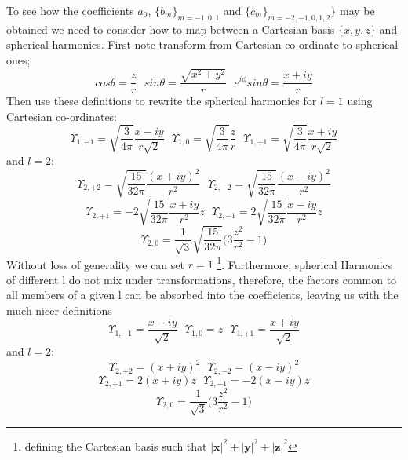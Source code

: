 \documentclass[12pt]{article}
\begin{document}
\noindent To see how the coefficients $a_{0}$, $\{b_{m}\}_{m=-1,0,1}$ and 
 $\{c_{m}\}_{m=-2,-1,0,1,2}\}$ may be
obtained we need to consider how to map between a Cartesian basis $\{x,y,z\}$
and spherical harmonics. First note transform from Cartesian co-ordinate to 
spherical ones; 
\begin{equation}
cos \theta = \frac{z}{r} \text{\ \ \ }
sin \theta = \frac{\sqrt{x^{2}+y^{2}}}{r} \text{\ \ \ }
e^{i\phi} sin\theta  = \frac{x+iy}{r} 
\end{equation}
\noindent Then use these definitions to rewrite the spherical harmonics for
$l=1$ using Cartesian co-ordinates:
\begin{equation}
\Upsilon_{1,-1} = \sqrt{\frac{3}{4\pi}}\frac{x-iy}{r\sqrt{2}} \text{\ \ \ }
\Upsilon_{1,0} = \sqrt{\frac{3}{4\pi}}\frac{z}{r} \text{\ \ \ }
\Upsilon_{1,+1} = \sqrt{\frac{3}{4\pi}}\frac{x+iy}{r\sqrt{2}}
\end{equation}
and $l=2$:
\begin{equation*}
\Upsilon_{2,+2} = \sqrt{\frac{15}{32\pi}}\frac{(x+iy)^{2}}{r^{2}} \text{\ \ \ }
\Upsilon_{2,-2} = \sqrt{\frac{15}{32\pi}}\frac{(x-iy)^{2}}{r^{2}}
\end{equation*}
\begin{equation*}
\Upsilon_{2,+1} = -2\sqrt{\frac{15}{32\pi}}\frac{x+iy}{r^{2}}z \text{\ \ \ }
\Upsilon_{2,-1} = 2\sqrt{\frac{15}{32\pi}}\frac{x-iy}{r^{2}}z
 \end{equation*}
\begin{equation}
\Upsilon_{2,0} = \frac{1}{\sqrt{3}}
 \sqrt{\frac{15}{32\pi}}\Bigg( 3 \frac{z^{2}}{r^{2}} -1 \Bigg )
\end{equation}
\noindent Without loss of generality we can set $r=1$ 
\footnote{defining the Cartesian basis such that $|\mathbf{x}|^{2}+|\mathbf{y}|^{2}+|\mathbf{z}|^{2}$ }. Furthermore, spherical Harmonics of different 
l do not mix under transformations, therefore, the factors common to
all members of a given l can be absorbed into the coefficients, leaving 
us with the much nicer definitions
\begin{equation}
\Upsilon_{1,-1} = \frac{x-iy}{\sqrt{2}} \text{\ \ \ }
\Upsilon_{1,0}  = z \text{\ \ \ }
\Upsilon_{1,+1} = \frac{x+iy}{\sqrt{2}}
\end{equation}
and $l=2$:
\begin{equation*}
\Upsilon_{2,+2} = (x+iy)^{2}\text{\ \ \ }
\Upsilon_{2,-2} = (x-iy)^{2}
\end{equation*}
\begin{equation*}
\Upsilon_{2,+1} = 2(x+iy)z \text { \ \ \ }
\Upsilon_{2,-1} = -2(x-iy)z 
\end{equation*}
\begin{equation}
 \Upsilon_{2,0} =\frac{1}{\sqrt{3}} \Bigg( 3\frac{z^{2}}{r^{2}} -1 \Bigg )
\end{equation}
\end{document}
